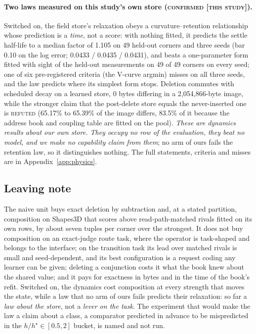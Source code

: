 \documentclass{article} %
\begin{document}
\paragraph{Two laws measured on this study's own store (\textsc{confirmed [this study]}).}
Switched on, the field store's relaxation obeys a curvature--retention relationship whose
prediction is a \emph{time}, not a score: with nothing fitted, it predicts the settle half-life to
a median factor of 1.105 on 49 held-out corners and three seeds (bar 0.10 on the log error; 0.0433
/ 0.0435 / 0.0431), and beats a one-parameter form fitted with sight of the held-out measurements
on 49 of 49 corners on every seed; one of six pre-registered criteria (the V-curve argmin) misses on
all three seeds, and the law predicts where its simplest form stops.
Deletion commutes with scheduled decay on a learned store, 0 bytes differing in a 2,054,866-byte
image, while the stronger claim that the post-delete store equals the never-inserted one is
\textsc{refuted} (65.17\% to 65.39\% of the image differs, 83.5\% of it because the address book
and coupling table are fitted on the pool). %
\emph{These are dynamics results about our own store. They occupy no row of the evaluation, they
beat no model, and we make no capability claim from them}; no arm of ours fails the retention law,
so it distinguishes nothing. The full statements, criteria and misses are in
Appendix~\ref{app:physics}.

\subsection{Leaving note}
\label{sec:leaving}

The naive unit buys exact deletion by subtraction and, at a stated partition, composition on
Shapes3D that scores above read-path-matched rivals fitted on its own rows, by about seven tuples per
corner over the strongest. It does not buy composition on an exact-judge route task, where the
operator is task-shaped and belongs to the interface; on the transition task its lead over matched
rivals is small and seed-dependent, and its best configuration is a request coding any learner can be
given; deleting a conjunction costs it what the book knew about the shared value; and it pays for
exactness in bytes and in the time of the book's refit. Switched on, the dynamics cost composition at
every strength that moves the state, while a law that no arm of ours fails predicts their relaxation:
so far a \emph{law about the store}, not a \emph{lever on the task}. The experiment that would make
the law a claim about a class, a comparator predicted in advance to be mispredicted in the
$h/h^\star\in[0.5,2]$ bucket, is named and not run. %
\end{document}
